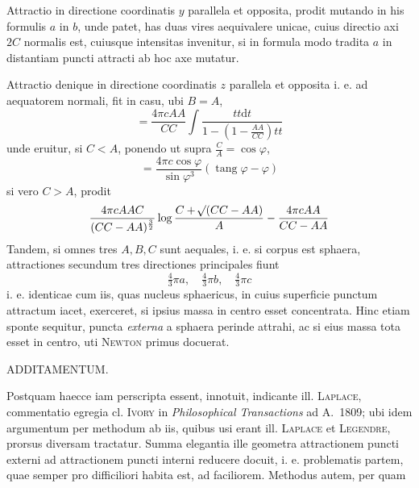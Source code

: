 \par
Attractio in directione coordinatis $y$ parallela et opposita, prodit mutando in his formulis $a$ in $b$, unde patet, has duas vires aequivalere unicae, cuius directio axi $2C$ normalis est, cuiusque intensitas invenitur, si in formula modo tradita $a$ in distantiam puncti attracti ab hoc axe mutatur.

Attractio denique in directione coordinatis $z$ parallela et opposita i. e. ad aequatorem normali, fit in casu, ubi $B=A$,
\[
=\frac{4\pi cAA}{CC}\int\frac{tt\mathrm{d}t}{1-(1-\frac{AA}{CC})tt}
\]
unde eruitur, si $C<A$, ponendo ut supra $\frac{C}{A}=\cos\varphi$,
\[
=\frac{4\pi c\cos\varphi}{\sin\varphi^3}(\operatorname{tang}\varphi-\varphi)
\]
si vero $C>A$, prodit
\[
\frac{4\pi cAAC}{(CC-AA)^{\frac32}}\log\frac{C+\mathord{{}^{}\!\surd}(CC-AA)}{A}-\frac{4\pi cAA}{CC-AA}
\]
Tandem, si omnes tres $A,B,C$ sunt aequales, i. e. si corpus est sphaera, attractiones secundum tres directiones principales fiunt
\[
\tfrac43\pi a,\quad\tfrac43\pi b,\quad\tfrac43\pi c
\]
i. e. identicae cum iis, quas nucleus sphaericus, in cuius superficie punctum attractum iacet, exerceret, si ipsius massa in centro esset concentrata. Hinc etiam sponte sequitur, puncta \textit{externa} a sphaera perinde attrahi, ac si eius massa tota esset in centro, uti \textsc{Newton} primus docuerat.

\par\bigskip{}
\centerline{ADDITAMENTUM.}\medskip
\par
Postquam haecce iam perscripta essent, innotuit, indicante ill. \textsc{Laplace}, commentatio egregia cl. \textsc{Ivory} in \textit{Philosophical Transactions} ad A.~1809; ubi idem argumentum per methodum ab iis, quibus usi erant ill. \textsc{Laplace} et \textsc{Legendre}, prorsus diversam tractatur. Summa elegantia ille geometra attractionem puncti externi ad attractionem puncti interni reducere docuit, i. e. problematis partem, quae semper pro difficiliori habita est, ad faciliorem. Methodus autem, per quam
